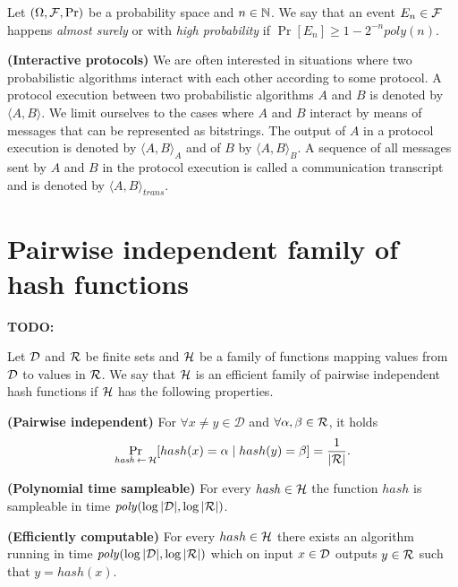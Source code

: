 Let $(\Omega, \mathcal{F}, \Pr)$ be a probability space and $n \in \mathbb{N}$. We say that an event $E_n \in \mathcal{F}$
happens \textit{almost surely} or with \textit{high probability} if $\Pr[E_n] \geq 1 - 2^{-n} \mathit{poly}(n)$.

\textbf{(Interactive protocols)} We are often interested in situations where two probabilistic algorithms interact with each other according to some protocol.
A protocol execution between two probabilistic algorithms $A$ and $B$ is denoted by $\langle A, B \rangle$.
We limit ourselves to the cases where $A$ and $B$ interact by means of messages that can be represented as bitstrings.
The output of $A$ in a protocol execution is denoted by $\langle A, B \rangle_A$ and of $B$ by $\langle A, B \rangle_B$.
A sequence of all messages sent by $A$ and $B$ in the protocol execution is called a communication transcript and
is denoted by $\langle A, B \rangle_{\mathit{trans}}$.
%
\section{Pairwise independent family of hash functions}
\begin{definition}
  \begin{todo}
    \textbf{TODO:}
  \end{todo}
\end{definition}

\begin{definition}
Let $\mathcal{D}$ and $\mathcal{R}$ be finite sets and $\mathcal{H}$ be a family of functions mapping values from $\mathcal{D}$ to values in $\mathcal{R}$.
We say that $\mathcal{H}$ is an \textnormal{efficient family of pairwise independent hash functions}
if $\mathcal{H}$ has the following properties.

\textbf{(Pairwise independent)} For $\forall x \neq y \in \mathcal{D}$ and $\forall \alpha, \beta \in \mathcal{R}$, it holds
\begin{displaymath}
\underset{\hash \la0 \cH}{\Pr}[hash(x) = \alpha \mid hash(y) = \beta] = \frac{1}{|\cR|}.
\end{displaymath}

\textbf{(Polynomial time sampleable)} For every $\mathit{hash} \in \mathcal{H}$ the function $\mathit{hash}$ is sampleable in time $\mathit{poly}(\log|\mathcal{D}|, \log|\mathcal{R}|)$.

\textbf{(Efficiently computable)}
For every $hash \in \mathcal{H}$ there exists an algorithm running in time $\mathit{poly}(\log|\mathcal{D}|, \log|\mathcal{R}|)$ which
on input $x \in \mathcal{D}$ outputs $y \in \mathcal{R}$ such that $y = hash(x)$.
\end{definition}

